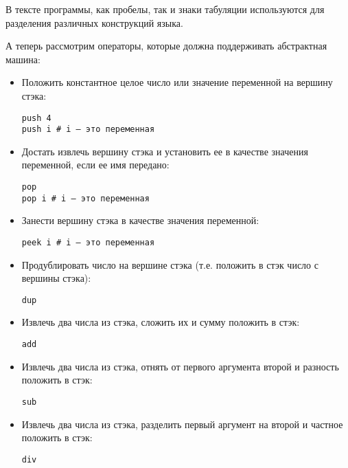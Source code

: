 \documentclass[a4paper,12pt]{article}
\begin{document}
В тексте программы, как пробелы, так и знаки табуляции используются
для разделения различных конструкций языка.

А теперь рассмотрим операторы, которые должна поддерживать абстрактная
машина:

\begin{itemize}
\item Положить константное целое число или значение переменной на
  вершину стэка:

\begin{verbatim}
push 4
push i # i – это переменная
\end{verbatim}

\item Достать извлечь вершину стэка и установить ее в качестве
  значения переменной, если ее имя передано:

\begin{verbatim}
pop
pop i # i – это переменная
\end{verbatim}

\item Занести вершину стэка в качестве значения переменной:

\begin{verbatim}
peek i # i – это переменная
\end{verbatim}

\item Продублировать число на вершине стэка (т.е. положить в стэк
  число с вершины стэка):

\begin{verbatim}
dup
\end{verbatim}

\item Извлечь два числа из стэка, сложить их и сумму положить в стэк:

\begin{verbatim}
add
\end{verbatim}

\item Извлечь два числа из стэка, отнять от первого аргумента второй и
  разность положить в стэк:

\begin{verbatim}
sub
\end{verbatim}

\item Извлечь два числа из стэка, разделить первый аргумент на второй
  и частное положить в стэк:

\begin{verbatim}
div
\end{verbatim}


\end{itemize}
\end{document}
